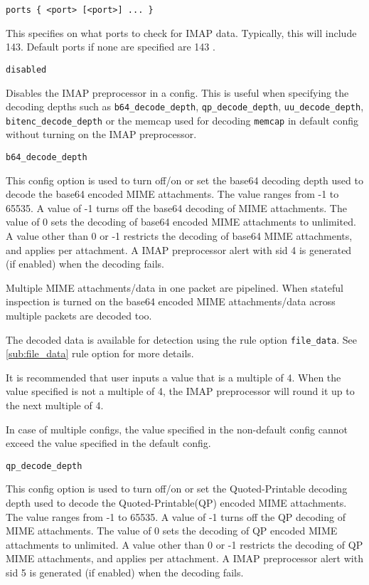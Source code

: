 \documentclass[english]{report}
\newcounter{slistnum}
\newenvironment{slist}
{ \begin{list}{ {\bf \arabic{slistnum}.} }{\usecounter{slistnum} } }
{ \end{list} }
\begin{document}
\begin{slist}

\item \texttt{ports \{ <port> [<port>] ... \}}

This specifies on what ports to check for IMAP data.  Typically, this will
include 143. Default ports if none are specified are 143 .

\item \texttt{disabled}

Disables the IMAP preprocessor in a config. This is useful when specifying
the decoding depths such as \texttt{b64\_decode\_depth}, \texttt{qp\_decode\_depth},
\texttt{uu\_decode\_depth}, \texttt{bitenc\_decode\_depth} or the memcap used for
decoding \texttt{memcap} in default config without turning on the IMAP preprocessor.

\item \texttt{b64\_decode\_depth}

This config option is used to turn off/on or set the base64 decoding depth used to
decode the base64 encoded MIME attachments. The value ranges from -1 to 65535.
A value of -1 turns off the base64 decoding of MIME attachments. The value of 0
sets the decoding of base64 encoded MIME attachments to unlimited. A value other
than 0 or -1 restricts the decoding of base64 MIME attachments, and applies per attachment. 
A IMAP preprocessor alert with sid 4 is generated (if enabled) when the decoding fails.

Multiple MIME attachments/data in one packet are pipelined. When stateful inspection
is turned on the base64 encoded MIME attachments/data across multiple packets are decoded too.

The decoded data is available for detection using the rule option \texttt{file\_data}.
See \ref{sub:file_data} rule option for more details.

It is recommended that user inputs a value that is a multiple of 4. When the value specified 
is not a multiple of 4, the IMAP preprocessor will round it up to the next multiple of 4.

In case of multiple configs, the value specified in the non-default config cannot
exceed the value specified in the default config.

\item \texttt{qp\_decode\_depth}

This config option is used to turn off/on or set the Quoted-Printable decoding depth
used to decode the Quoted-Printable(QP) encoded MIME attachments. The value ranges
from -1 to 65535. A value of -1 turns off the QP decoding of MIME attachments.
The value of 0 sets the decoding of QP encoded MIME attachments to unlimited. A
value other than 0 or -1 restricts the decoding of QP MIME attachments, and applies per 
attachment. A IMAP preprocessor alert with sid 5 is generated (if enabled) when the decoding fails.


\end{slist}
\end{document}
